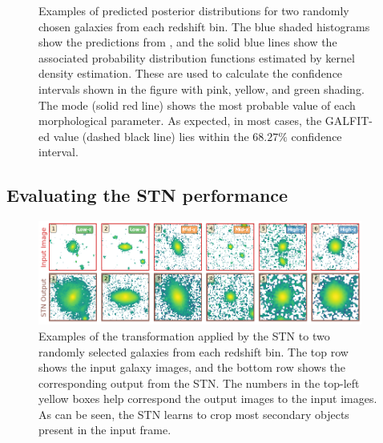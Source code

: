 \begin{figure}
    \begin{center}
  \end{center}
  \caption{Examples of predicted posterior distributions for two randomly chosen galaxies from each redshift bin. The blue shaded histograms show the predictions from \gampen{}, and the solid blue lines show the associated probability distribution functions estimated by kernel density estimation. These are used to calculate the confidence intervals shown in the figure with pink, yellow, and green shading. The mode (solid red line) shows the most probable value of each morphological parameter. As expected, in most cases, the GALFIT-ed value (dashed black line) lies within the $68.27\%$ confidence interval.}
  \label{fig_c3:example_pred_dists}
\end{figure}


\subsection{Evaluating the STN performance} \label{sec_c3:stn_performance}

\begin{figure}[htb]
    \centering
    \includegraphics[width = 0.95\textwidth]{stn_random.png}
    \caption{Examples of the transformation applied by the STN to two randomly selected galaxies from each redshift bin. The top row shows the input galaxy images, and the bottom row shows the corresponding output from the STN. The numbers in the top-left yellow boxes help correspond the output images to the input images. As can be seen, the STN learns to crop most secondary objects present in the input frame.}
    \label{fig_c3:stn_random}
\end{figure}

